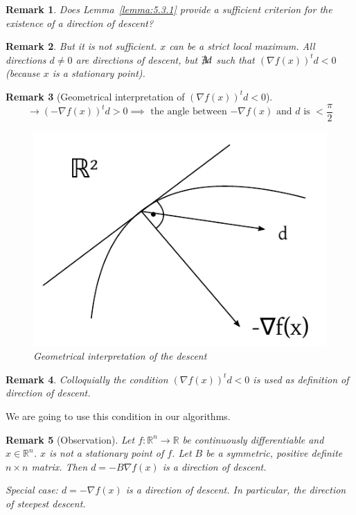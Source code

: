\documentclass[a4paper]{article}
\numberwithin{lecref}{subsection}
\newtheorem*{Remark}{Remark}
\begin{document}
\begin{Remark}
	Does Lemma~\ref{lemma:5.3.1} provide a sufficient criterion for the existence of a direction of descent?
\end{Remark}
\begin{Remark}
	But it is not sufficient. $x$ can be a strict local maximum.
	All directions $d \neq 0$ are directions of descent, but $\not\exists d$ such that $\left(\nabla f(x)\right)^t d < 0$ (because $x$ is a stationary point).
\end{Remark}
\begin{Remark}[Geometrical interpretation of $\left(\nabla f(x)\right)^t d < 0$]
	\[ \to \left(- \nabla f(x)\right)^t d > 0 \implies \text{ the angle between $-\nabla f(x)$ and $d$ is } < \frac\pi2 \]
	\begin{figure}[t]
		\begin{center}
			\includegraphics{img/25_descent.pdf}
			\caption{Geometrical interpretation of the descent}
		\end{center}
	\end{figure}
\end{Remark}
\begin{Remark}
	Colloquially the condition $(\nabla f(x))^t d < 0$ is used as definition of direction of descent.
\end{Remark}

We are going to use this condition in our algorithms.

\begin{Remark}[Observation]
	Let $f: \mathbb R^n \to \mathbb R$ be continuously differentiable and $x \in \mathbb R^n$. $x$ is not a stationary point of $f$.
	Let $B$ be a symmetric, positive definite $n\times n$ matrix. Then $d = -B \nabla f(x)$ is a direction of descent.

	\emph{Special case:} $d = -\nabla f(x)$ is a direction of descent. In particular, the direction of \emph{steepest descent}.
\end{Remark}
\end{document}
